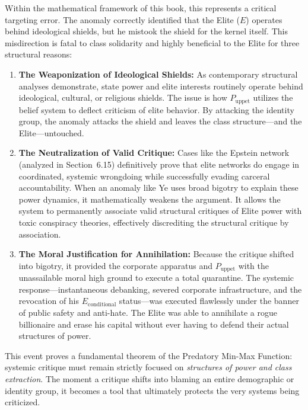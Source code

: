 Within the mathematical framework of this book, this represents a critical targeting error. The anomaly correctly identified that the Elite ($E$) operates behind ideological shields, but he mistook the shield for the kernel itself. This misdirection is fatal to class solidarity and highly beneficial to the Elite for three structural reasons:

\begin{enumerate}
    \item \textbf{The Weaponization of Ideological Shields:} As contemporary structural analyses demonstrate, state power and elite interests routinely operate behind ideological, cultural, or religious shields. The issue is how $P_{\text{uppet}}$ utilizes the belief system to deflect criticism of elite behavior. By attacking the identity group, the anomaly attacks the shield and leaves the class structure---and the Elite---untouched.

    \item \textbf{The Neutralization of Valid Critique:} Cases like the Epstein network (analyzed in Section~6.15) definitively prove that elite networks do engage in coordinated, systemic wrongdoing while successfully evading carceral accountability. When an anomaly like Ye uses broad bigotry to explain these power dynamics, it mathematically weakens the argument. It allows the system to permanently associate valid structural critiques of Elite power with toxic conspiracy theories, effectively discrediting the structural critique by association.

    \item \textbf{The Moral Justification for Annihilation:} Because the critique shifted into bigotry, it provided the corporate apparatus and $P_{\text{uppet}}$ with the unassailable moral high ground to execute a total quarantine. The systemic response---instantaneous debanking, severed corporate infrastructure, and the revocation of his $E_{\text{conditional}}$ status---was executed flawlessly under the banner of public safety and anti-hate. The Elite was able to annihilate a rogue billionaire and erase his capital without ever having to defend their actual structures of power.
\end{enumerate}

This event proves a fundamental theorem of the Predatory Min-Max Function: systemic critique must remain strictly focused on \textit{structures of power and class extraction}. The moment a critique shifts into blaming an entire demographic or identity group, it becomes a tool that ultimately protects the very systems being criticized.

